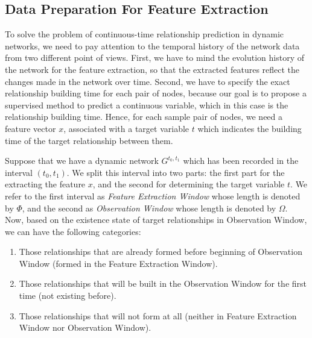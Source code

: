 \subsection{Data Preparation For Feature Extraction}
To solve the problem of continuous-time relationship prediction in dynamic networks, we need to pay attention to the temporal history of the network data from two different point of views. First, we have to mind the evolution history of the network for the feature extraction, so that the extracted features reflect the changes made in the network over time. Second, we have to specify the exact relationship building time for each pair of nodes, because our goal is to propose a supervised method to predict a continuous variable, which in this case is the relationship building time. Hence, for each sample pair of nodes, we need a feature vector $x$, associated with a target variable $t$ which indicates the building time of the target relationship between them.

Suppose that we have a dynamic network $G^{t_0,t_1}$ which has been recorded in the interval $(t_0, t_1)$. We split this interval into two parts: the first part for the extracting the feature $x$, and the second for determining the target variable $t$. We refer to the first interval as \emph{Feature Extraction Window} whose length is denoted by $\Phi$, and the second as \emph{Observation Window} whose length is denoted by $\Omega$. Now, based on the existence state of target relationships in Observation Window, we can have the following categories:

\begin{enumerate}
	\item Those relationships that are already formed before beginning of Observation Window (formed in the Feature Extraction Window).
	\item Those relationships that will be built in the Observation Window for the first time (not existing before).
	\item Those relationships that will not form at all (neither in Feature Extraction Window nor Observation Window).
\end{enumerate}

